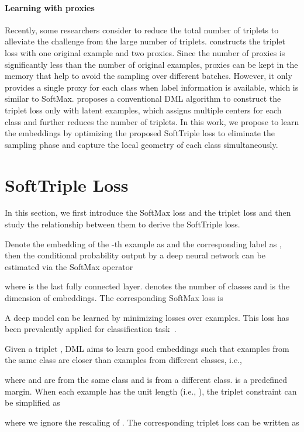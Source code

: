 \documentclass[10pt,twocolumn,letterpaper]{article}
\begin{document}
\paragraph{Learning with proxies}
Recently, some researchers consider to reduce the total number of triplets to alleviate the challenge from the large number of triplets. \cite{Attias17} constructs the triplet loss with one original example and two proxies. Since the number of proxies is significantly less than the number of original examples, proxies can be kept in the memory that help to avoid the sampling over different batches. However, it only provides a single proxy for each class when label information is available, which is similar to SoftMax. \cite{QianTLZJ18} proposes a conventional DML algorithm to construct the triplet loss only with latent examples, which assigns multiple centers for each class and further reduces the number of triplets. In this work, we propose to learn the embeddings by optimizing the proposed SoftTriple loss to eliminate the sampling phase and capture the local geometry of each class simultaneously.

\section{SoftTriple Loss}
\label{sec:method}
In this section, we first introduce the SoftMax loss and the triplet loss and then study the relationship between them to derive the SoftTriple loss. 

Denote the embedding of the -th example as  and the corresponding label as , then the conditional probability output by a deep neural network can be estimated via the SoftMax operator

where  is the last fully connected layer.  denotes the number of classes and  is the dimension of embeddings.
The corresponding SoftMax loss is

A deep model can be learned by minimizing losses over examples. This loss has been prevalently applied for classification task~\cite{KrizhevskySH12}.

Given a triplet , DML aims to learn good embeddings such that examples from the same class are closer than examples from different classes, i.e.,

where  and  are from the same class and  is from a different class.  is a predefined margin. When each example has the unit length (i.e., ), the triplet constraint can be simplified as

where we ignore the rescaling of .
The corresponding triplet loss can be written as
\end{document}
